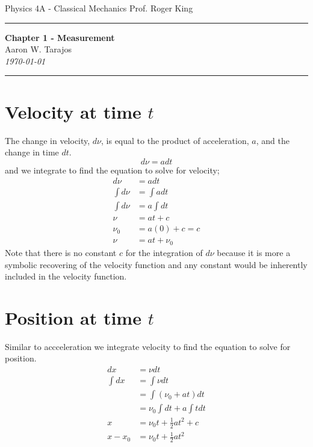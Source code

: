 \documentclass{article}
\begin{document}
Physics 4A - Classical Mechanics \hfill Prof. Roger King

\noindent\rule{\textwidth}{0.4pt}

\begin{center}
    \textbf{\LARGE Chapter 1 - Measurement} \\
    \vspace{12pt}
    \large Aaron W. Tarajos \\
    \textit{\today}
\end{center}

\noindent\rule{\textwidth}{0.4pt}

\section*{Velocity at time $t$}
The change in velocity, $d\nu$, is equal to the product of acceleration, $a$, and the change in time $dt$.
\[
	d\nu = a dt
\]
and we integrate to find the equation to solve for velocity;
\begin{align*}
	d\nu &= adt \\
	\int d\nu &= \int adt \\
	\int d\nu &= a \int dt \\
	\nu &= at + c \\
	\nu_0 &= a(0) + c = c \\
	\nu &= at + \nu_0
\end{align*}
Note that there is no constant $c$ for the integration of $d\nu$ because it is more a symbolic recovering of the velocity function and any constant would be inherently included in the velocity function.

\section*{Position at time $t$}
Similar to accceleration we integrate velocity to find the equation to solve for position.
\begin{align*}
	dx &= \nu dt \\
	\int dx &= \int \nu dt \\
	&= \int \left( \nu_0 + at \right) dt \\
	&= \nu_0 \int dt + a \int tdt \\
	x &= \nu_0t + \frac{1}{2} at^2 + c \\
	x-x_0 &= \nu_0t + \frac{1}{2} at^2 \\
\end{align*}
\end{document}
